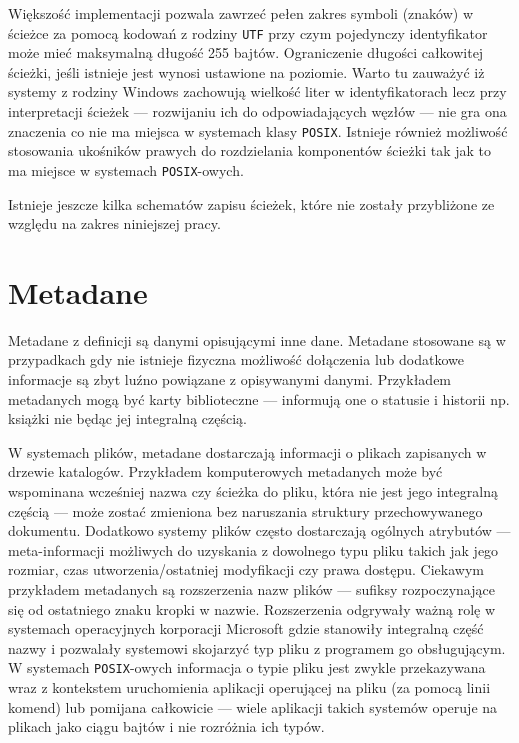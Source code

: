 \par
Większość implementacji pozwala zawrzeć pełen zakres symboli (znaków) w ścieżce za pomocą kodowań z rodziny \texttt{UTF} przy czym pojedynczy identyfikator może mieć maksymalną długość 255 bajtów. Ograniczenie długości całkowitej ścieżki, jeśli istnieje jest wynosi ustawione na poziomie.
Warto tu zauważyć iż systemy z rodziny Windows zachowują wielkość liter w identyfikatorach lecz przy interpretacji ścieżek --- rozwijaniu ich do odpowiadających węzłów --- nie gra ona znaczenia co nie ma miejsca w systemach klasy \texttt{POSIX}. Istnieje również możliwość stosowania ukośników prawych do rozdzielania komponentów ścieżki tak jak to ma miejsce w systemach \texttt{POSIX}-owych.

\par
Istnieje jeszcze kilka schematów zapisu ścieżek, które nie zostały przybliżone ze względu na zakres niniejszej pracy.

\clearpage

\section{Metadane}
\par
Metadane z definicji są danymi opisującymi inne dane. Metadane stosowane są w przypadkach gdy nie istnieje fizyczna możliwość dołączenia lub dodatkowe informacje są zbyt luźno powiązane z opisywanymi danymi.
Przykładem metadanych mogą być karty biblioteczne --- informują one o statusie i historii np. książki nie będąc jej integralną częścią.

\par
W systemach plików, metadane dostarczają informacji o plikach zapisanych w drzewie katalogów.
Przykładem komputerowych metadanych może być wspominana wcześniej nazwa czy ścieżka do pliku, która nie jest jego integralną częścią --- może zostać zmieniona bez naruszania struktury przechowywanego dokumentu.
Dodatkowo systemy plików często dostarczają ogólnych atrybutów --- meta-informacji możliwych do uzyskania z dowolnego typu pliku takich jak jego rozmiar, czas utworzenia/ostatniej modyfikacji czy prawa dostępu.
Ciekawym przykładem metadanych są rozszerzenia nazw plików --- sufiksy rozpoczynające się od ostatniego znaku kropki w nazwie. Rozszerzenia odgrywały ważną rolę w systemach operacyjnych korporacji Microsoft gdzie stanowiły integralną część nazwy i pozwalały systemowi skojarzyć typ pliku z programem go obsługującym. W systemach \texttt{POSIX}-owych informacja o typie pliku jest zwykle przekazywana wraz z kontekstem uruchomienia aplikacji operującej na pliku (za pomocą linii komend) lub pomijana całkowicie --- wiele aplikacji takich systemów operuje na plikach jako ciągu bajtów i nie rozróżnia ich typów.

